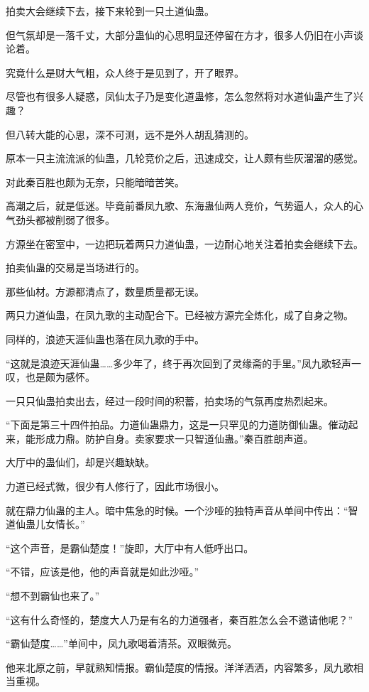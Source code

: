 \begin{this_body}
拍卖大会继续下去，接下来轮到一只土道仙蛊。

但气氛却是一落千丈，大部分蛊仙的心思明显还停留在方才，很多人仍旧在小声谈论着。

究竟什么是财大气粗，众人终于是见到了，开了眼界。

尽管也有很多人疑惑，凤仙太子乃是变化道蛊修，怎么忽然将对水道仙蛊产生了兴趣？

但八转大能的心思，深不可测，远不是外人胡乱猜测的。

原本一只主流流派的仙蛊，几轮竞价之后，迅速成交，让人颇有些灰溜溜的感觉。

对此秦百胜也颇为无奈，只能暗暗苦笑。

高潮之后，就是低迷。毕竟前番凤九歌、东海蛊仙两人竞价，气势逼人，众人的心气劲头都被削弱了很多。

方源坐在密室中，一边把玩着两只力道仙蛊，一边耐心地关注着拍卖会继续下去。

拍卖仙蛊的交易是当场进行的。

那些仙材。方源都清点了，数量质量都无误。

两只力道仙蛊，在凤九歌的主动配合下。已经被方源完全炼化，成了自身之物。

同样的，浪迹天涯仙蛊也落在凤九歌的手中。

“这就是浪迹天涯仙蛊……多少年了，终于再次回到了灵缘斋的手里。”凤九歌轻声一叹，也是颇为感怀。

一只只仙蛊拍卖出去，经过一段时间的积蓄，拍卖场的气氛再度热烈起来。

“下面是第三十四件拍品。力道仙蛊鼎力，这是一只罕见的力道防御仙蛊。催动起来，能形成力鼎。防护自身。卖家要求一只智道仙蛊。”秦百胜朗声道。

大厅中的蛊仙们，却是兴趣缺缺。

力道已经式微，很少有人修行了，因此市场很小。

就在鼎力仙蛊的主人。暗中焦急的时候。一个沙哑的独特声音从单间中传出：“智道仙蛊儿女情长。”

“这个声音，是霸仙楚度！”旋即，大厅中有人低呼出口。

“不错，应该是他，他的声音就是如此沙哑。”

“想不到霸仙也来了。”

“这有什么奇怪的，楚度大人乃是有名的力道强者，秦百胜怎么会不邀请他呢？”

“霸仙楚度……”单间中，凤九歌喝着清茶。双眼微亮。

他来北原之前，早就熟知情报。霸仙楚度的情报。洋洋洒洒，内容繁多，凤九歌相当重视。


\end{this_body}
